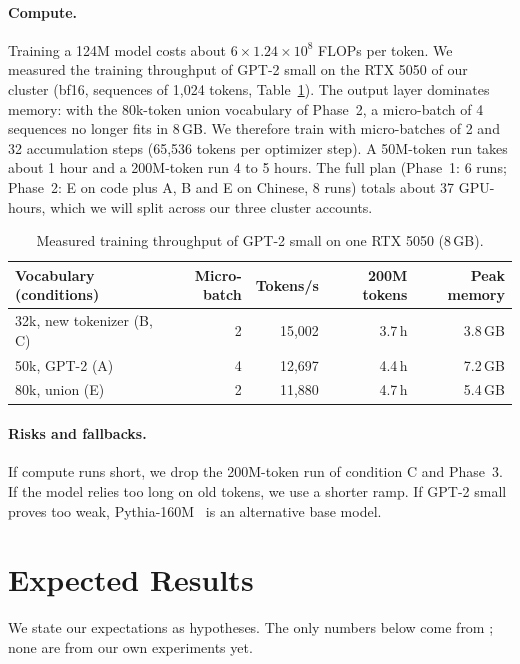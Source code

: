 \documentclass[11pt,a4paper]{article}
\begin{document}
\paragraph{Compute.} Training a 124M model costs about $6 \times 1.24\times10^{8}$ FLOPs per token. We measured the training throughput of GPT-2 small on the RTX 5050 of our cluster (bf16, sequences of 1{,}024 tokens, Table~\ref{tab:speed}). The output layer dominates memory: with the 80k-token union vocabulary of Phase~2, a micro-batch of 4 sequences no longer fits in 8\,GB. We therefore train with micro-batches of 2 and 32 accumulation steps (65{,}536 tokens per optimizer step). A 50M-token run takes about 1 hour and a 200M-token run 4 to 5 hours. The full plan (Phase~1: 6 runs; Phase~2: E on code plus A, B and E on Chinese, 8 runs) totals about 37 GPU-hours, which we will split across our three cluster accounts.

\begin{table}[h]
\centering
\caption{Measured training throughput of GPT-2 small on one RTX 5050 (8\,GB).}
\label{tab:speed}
\begin{tabular}{lrrrr}
\toprule
Vocabulary (conditions) & Micro-batch & Tokens/s & 200M tokens & Peak memory \\
\midrule
32k, new tokenizer (B, C) & 2 & 15{,}002 & 3.7\,h & 3.8\,GB \\
50k, GPT-2 (A) & 4 & 12{,}697 & 4.4\,h & 7.2\,GB \\
80k, union (E) & 2 & 11{,}880 & 4.7\,h & 5.4\,GB \\
\bottomrule
\end{tabular}
\end{table}

\paragraph{Risks and fallbacks.} If compute runs short, we drop the 200M-token run of condition C and Phase~3. If the model relies too long on old tokens, we use a shorter ramp. If GPT-2 small proves too weak, Pythia-160M~\citep{biderman2023pythia} is an alternative base model.

\section{Expected Results}
\label{sec:expected}

We state our expectations as hypotheses. The only numbers below come from \citet{dagan2024tokenizer}; none are from our own experiments yet.
\end{document}
